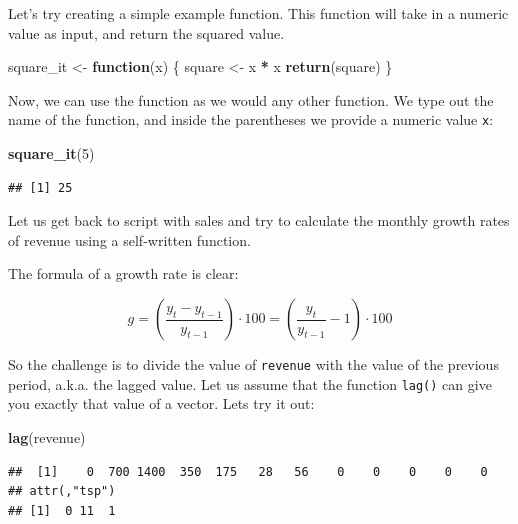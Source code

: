 \documentclass[
  12pt,
  oneside]{book}
\newenvironment{Shaded}{\begin{snugshade}}{\end{snugshade}}
\newcommand{\ControlFlowTok}[1]{\textcolor[rgb]{0.13,0.29,0.53}{\textbf{#1}}}
\newcommand{\DecValTok}[1]{\textcolor[rgb]{0.00,0.00,0.81}{#1}}
\newcommand{\FunctionTok}[1]{\textcolor[rgb]{0.13,0.29,0.53}{\textbf{#1}}}
\newcommand{\NormalTok}[1]{#1}
\newcommand{\OtherTok}[1]{\textcolor[rgb]{0.56,0.35,0.01}{#1}}
\newcommand{\SpecialCharTok}[1]{\textcolor[rgb]{0.81,0.36,0.00}{\textbf{#1}}}
\theoremstyle{definition}
\theoremstyle{definition}
\theoremstyle{definition}
\theoremstyle{definition}
\theoremstyle{remark}
\begin{document}
Let's try creating a simple example function. This function will take in a numeric value as input, and return the squared value.

\begin{Shaded}
\begin{Highlighting}[]
\NormalTok{square\_it }\OtherTok{\textless{}{-}} \ControlFlowTok{function}\NormalTok{(x) \{ }
\NormalTok{   square }\OtherTok{\textless{}{-}}\NormalTok{ x }\SpecialCharTok{*}\NormalTok{ x}
   \FunctionTok{return}\NormalTok{(square)}
\NormalTok{\} }
\end{Highlighting}
\end{Shaded}

Now, we can use the function as we would any other function. We type out the name of the function, and inside the parentheses we provide a numeric value \texttt{x}:

\begin{Shaded}
\begin{Highlighting}[]
\FunctionTok{square\_it}\NormalTok{(}\DecValTok{5}\NormalTok{)}
\end{Highlighting}
\end{Shaded}

\begin{verbatim}
## [1] 25
\end{verbatim}

Let us get back to script with sales and try to calculate the monthly growth rates of revenue using a self-written function.

The formula of a growth rate is clear:

\[ g=\left(\frac{y_t-y_{t-1}}{y_{t-1}}\right)\cdot 100=\left(\frac{y_t}{y_{t-1}}-1\right)\cdot 100 \]

So the challenge is to divide the value of \texttt{revenue} with the value of the previous period, a.k.a. the lagged value. Let us assume that the function \texttt{lag()} can give you exactly that value of a vector. Lets try it out:

\begin{Shaded}
\begin{Highlighting}[]
\FunctionTok{lag}\NormalTok{(revenue)}
\end{Highlighting}
\end{Shaded}

\begin{verbatim}
##  [1]    0  700 1400  350  175   28   56    0    0    0    0    0
## attr(,"tsp")
## [1]  0 11  1
\end{verbatim}
\end{document}

